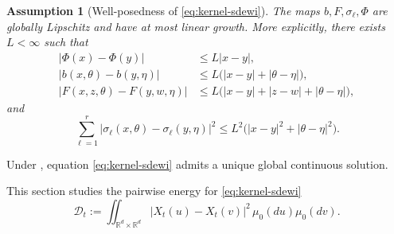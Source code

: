 \documentclass{tsp-short}
\newtheorem{assumption}{Assumption}
\theoremstyle{remark}
\theoremstyle{definition}
\newcommand{\R}{\mathbb{R}} %
\begin{document}
\begin{assumption}[Well-posedness of \eqref{eq:kernel-sdewi}]\label{ass:kernel-wellposedness}
	The maps \(b,F,\sigma_\ell,\Phi\) are globally Lipschitz and have at most linear growth.
	More explicitly, there exists \(L<\infty\) such that
	\begin{align*}
		|\Phi(x)-\Phi(y)|           & \le L|x-y|,                               \\
		|b(x,\theta)-b(y,\eta)|     & \le L\big(|x-y|+|\theta-\eta|\big),       \\
		|F(x,z,\theta)-F(y,w,\eta)| & \le L\big(|x-y|+|z-w|+|\theta-\eta|\big),
	\end{align*}
	and
	\begin{equation*}
		\sum_{\ell=1}^r |\sigma_\ell(x,\theta)-\sigma_\ell(y,\eta)|^2 \le L^2\big(|x-y|^2+|\theta-\eta|^2\big).
	\end{equation*}
\end{assumption}

Under , equation \eqref{eq:kernel-sdewi} admits a unique global continuous solution.

This section studies the pairwise energy for \eqref{eq:kernel-sdewi}
\begin{equation*}
	\mathcal D_t := \iint_{\R^d\times\R^d} |X_t(u)-X_t(v)|^2\,\mu_0(du)\mu_0(dv).
\end{equation*}

\end{document}
